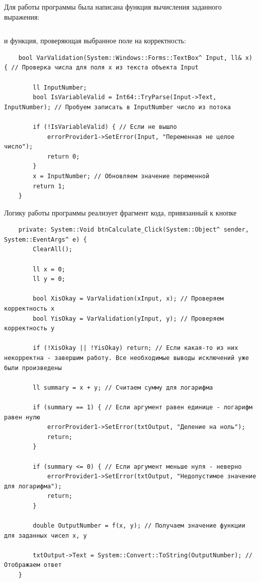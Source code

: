 Для работы программы была написана функция вычисления заданного выражения:
\inputminted[fontsize=\small, breaklines=true, style=bw, linenos]{cpp}{task2/f.h}
и функция, проверяющая выбранное поле на корректность:
\begin{verbatim}
    bool VarValidation(System::Windows::Forms::TextBox^ Input, ll& x) { // Проверка числа для поля x из текста объекта Input
		
		ll InputNumber;
		bool IsVariableValid = Int64::TryParse(Input->Text, InputNumber); // Пробуем записать в InputNumber число из потока
		
		if (!IsVariableValid) { // Если не вышло
			errorProvider1->SetError(Input, "Переменная не целое число");
			return 0;
		}
		x = InputNumber; // Обновляем значение переменной
		return 1;
    }
\end{verbatim}
Логику работы программы реализует фрагмент кода, привязанный к кнопке
\begin{verbatim}
	private: System::Void btnCalculate_Click(System::Object^ sender, System::EventArgs^ e) {
		ClearAll();

		ll x = 0;
		ll y = 0;

		bool XisOkay = VarValidation(xInput, x); // Проверяем корректность x
		bool YisOkay = VarValidation(yInput, y); // Проверяем корректность y

		if (!XisOkay || !YisOkay) return; // Если какая-то из них некорректна - завершим работу. Все необходимые выводы исключений уже были произведены

		ll summary = x + y; // Считаем сумму для логарифма

		if (summary == 1) { // Если аргумент равен единице - логарифм равен нулю
			errorProvider1->SetError(txtOutput, "Деление на ноль");
			return;
		}

		if (summary <= 0) { // Если аргумент меньше нуля - неверно
			errorProvider1->SetError(txtOutput, "Недопустимое значение для логарифма");
			return;
		}

		double OutputNumber = f(x, y); // Получаем значение функции для заданных чисел х, у

		txtOutput->Text = System::Convert::ToString(OutputNumber); // Отображаем ответ
	}
\end{verbatim}

